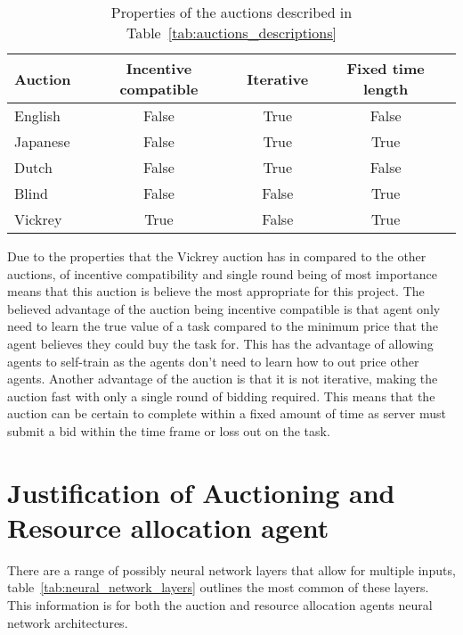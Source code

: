 \begin{table}[h]
    \centering
    \begin{tabular}{|l|c|c|c|} \hline
        Auction  & Incentive compatible & Iterative & Fixed time length\\ \hline
        English  & False                & True      & False            \\ \hline
        Japanese & False                & True      & True             \\ \hline
        Dutch    & False                & True      & False            \\ \hline
        Blind    & False                & False     & True             \\ \hline
        Vickrey  & True                 & False     & True             \\ \hline
    \end{tabular}
    \caption{Properties of the auctions described in Table~\ref{tab:auctions_descriptions}}
    \label{tab:auction_properties}
\end{table}

Due to the properties that the Vickrey auction has in compared to the other auctions, of incentive compatibility and
single round being of most importance means that this auction is believe the most appropriate for this project. The
believed advantage of the auction being incentive compatible is that agent only need to learn the true value of a task
compared to the minimum price that the agent believes they could buy the task for. This has the advantage of allowing
agents to self-train as the agents don't need to learn how to out price other agents. Another advantage of the auction
is that it is not iterative, making the auction fast with only a single round of bidding required. This means that the
auction can be certain to complete within a fixed amount of time as server must submit a bid within the time frame
or loss out on the task.


\section{Justification of Auctioning and Resource allocation agent}\label{sec:justification-of-auctioning-and-resource-allocation-agent}
There are a range of possibly neural network layers that allow for multiple inputs,
table~\ref{tab:neural_network_layers} outlines the most common of these layers. This information is for both the
auction and resource allocation agents neural network architectures.

